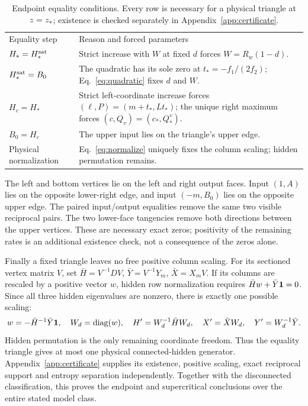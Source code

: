 \begin{table}[htbp]
\caption{Endpoint equality conditions. Every row is necessary for a physical
triangle at $z=z_*$; existence is checked separately in
Appendix~\ref{app:certificate}.}\label{tab:equality-rigidity}
\begin{ruledtabular}
\begin{tabular}{p{}p{}}
Equality step & Reason and forced parameters\\
$H_*=H_*^{\rm sat}$ & Strict increase with $W$ at fixed $d$ forces
$W=R_w(1-d)$.\\
$H_*^{\rm sat}=B_0$ & The quadratic has its sole zero at
$t_*=-f_1/(2f_2)$; Eq.~\eqref{eq:quadratic} fixes $d$ and $W$.\\
$H_c=H_*$ & Strict left-coordinate increase forces
$(\ell,P)=(m+t_*,Lt_*)$; the unique right maximum forces
$(c,Q_v)=(c_*,Q_*^v)$.\\
$B_0=H_c$ & The upper input lies on the triangle's upper edge.\\
Physical normalization & Eq.~\eqref{eq:normalize} uniquely fixes the
column scaling; hidden permutation remains.\\
\end{tabular}
\end{ruledtabular}
\end{table}

The left and bottom vertices lie on the left and right output faces.
Input $(1,A)$ lies on the opposite lower-right edge, and input
$(-m,B_0)$ lies on the opposite upper edge. The paired input/output
equalities remove the same two visible reciprocal pairs. The two
lower-face tangencies remove both directions between the upper
vertices. These are necessary exact zeros; positivity of the remaining
rates is an additional existence check, not a consequence of the zeros
alone.

Finally a fixed triangle leaves no free positive column scaling. For
its sectioned vertex matrix $V$, set
$\bar H=V^{-1}DV$, $\bar Y=V^{-1}Y_m$, $\bar X=X_mV$.
If its columns are rescaled by a positive vector $w$, hidden row
normalization requires $\bar H w+\bar Y\mathbf 1=0$. Since all three hidden
eigenvalues are nonzero, there is exactly one possible scaling:
\begin{equation}
 w=-\bar H^{-1}\bar Y\mathbf 1,\quad W_d=\operatorname{diag}(w),\quad
 H'=W_d^{-1}\bar HW_d,\quad X'=\bar XW_d,\quad
 Y'=W_d^{-1}\bar Y.\label{eq:normalize}
\end{equation}
Hidden permutation is the only remaining coordinate freedom. Thus the
equality triangle gives at most one physical connected-hidden generator.
Appendix~\ref{app:certificate} supplies its existence, positive scaling,
exact reciprocal support and entropy separation independently. Together
with the disconnected classification, this proves the endpoint and
supercritical conclusions over the entire stated model class.

